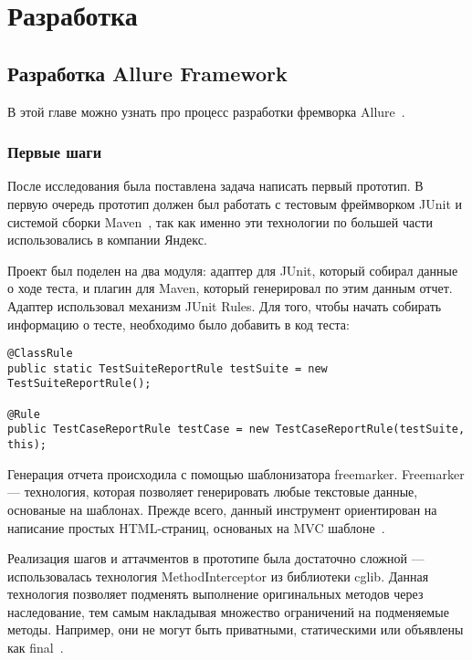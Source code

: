 \chapter{Разработка} 
\label{chapter3}

\section{Разработка Allure Framework}

В этой главе можно узнать про процесс разработки фремворка Allure~\cite{allure_home}.

\subsection{Первые шаги}

После исследования была поставлена задача написать первый прототип. В первую очередь прототип должен был работать с тестовым фреймворком JUnit и системой сборки Maven~\cite{maven_home}, так как именно эти технологии по большей части использовались в компании Яндекс. 

Проект был поделен на два модуля: адаптер для JUnit, который собирал данные о ходе теста, и плагин для Maven, который генерировал по этим данным отчет. Адаптер использовал механизм JUnit Rules. Для того, чтобы начать собирать информацию о тесте, необходимо было добавить в код теста:

\begin{lstlisting}[caption=Пример подключения к тестам JUnit Rules.]
@ClassRule
public static TestSuiteReportRule testSuite = new TestSuiteReportRule();

@Rule
public TestCaseReportRule testCase = new TestCaseReportRule(testSuite, this);
\end{lstlisting}


Генерация отчета происходила с помощью шаблонизатора freemarker. Freemarker --- технология, которая позволяет генерировать любые текстовые данные, основаные на шаблонах. Прежде всего, данный инструмент ориентирован на написание простых HTML-страниц, основаных на MVC шаблоне~\cite{freemarker_home}.

Реализация шагов и аттачментов в прототипе была достаточно сложной --- использовалась технология MethodInterceptor из библиотеки cglib. Данная технология позволяет подменять выполнение оригинальных методов через наследование, тем самым накладывая множество ограничений на подменяемые методы. Например, они не могут быть приватными, статическими или объявлены как final~\cite{cglib_home}. 

